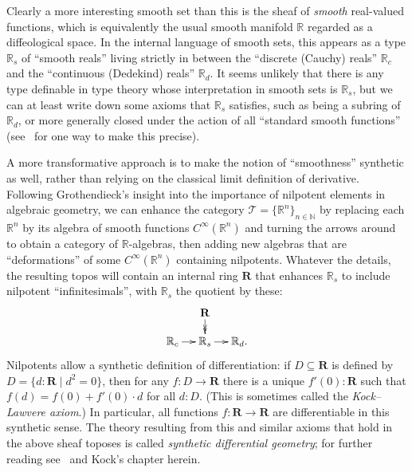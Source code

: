 \documentclass[12pt]{article}
\def\oo{\ensuremath{\infty}}
\def\N{\mathbb{N}}
\def\R{\mathbb{R}}
\def\bR{\mathbf{R}}
\def\T{\mathcal{T}}
\numberwithin{equation}{section}
\begin{document}
Clearly a more interesting smooth set than this is the sheaf of \emph{smooth} real-valued functions, which is equivalently the usual smooth manifold $\R$ regarded as a diffeological space.
In the internal language of smooth sets, this appears as a type $\R_s$ of ``smooth reals'' living strictly in between the ``discrete (Cauchy) reals'' $\R_c$ and the ``continuous (Dedekind) reals'' $\R_d$.
It seems unlikely that there is any type definable in type theory whose interpretation in smooth sets is $\R_s$, but we can at least write down some axioms that $\R_s$ satisfies, such as being a subring of $\R_d$, or more generally closed under the action of all ``standard smooth functions'' (see~\cite{fourman:smooth-reals} for one way to make this precise).

A more transformative approach is to make the notion of ``smoothness'' synthetic as well, rather than relying on the classical limit definition of derivative.
Following Grothendieck's insight into the importance of nilpotent elements in algebraic geometry, we can enhance the category $\T = \{\R^n\}_{n\in \N}$ by replacing each $\R^n$ by its algebra of smooth functions $C^\oo(\R^n)$ and turning the arrows around to obtain a category of $\R$-algebras, then adding new algebras that are ``deformations'' of some $C^\oo(\R^n)$ containing nilpotents.
Whatever the details, the resulting topos will contain an internal ring $\bR$ that enhances $\R_s$ to include nilpotent ``infinitesimals'', with $\R_s$ the quotient by these:
\[\xymatrix@-1pc{ & \bR \ar@{->>}[d] \\
\R_c \ar[r] & \R_s \ar[r] & \R_d. } \]
Nilpotents allow a synthetic definition of differentiation:
if $D\subseteq \bR$ is defined by $D = \{ d:\bR \mid d^2=0 \}$, then for any $f:D\to\bR$ there is a unique $f'(0):\bR$ such that $f(d) = f(0) + f'(0)\cdot d$ for all $d:D$.
(This is sometimes called the \emph{Kock--Lawvere axiom}.)
In particular, all functions $f:\bR\to\bR$ are differentiable in this synthetic sense.
The theory resulting from this and similar axioms that hold in the above sheaf toposes is called \textit{synthetic differential geometry}; for further reading see~\cite{bell:sdg,kock:sdg,moerdijk-reyes:sia,lavendhomme:sdg} and Kock's chapter herein.
\end{document}
